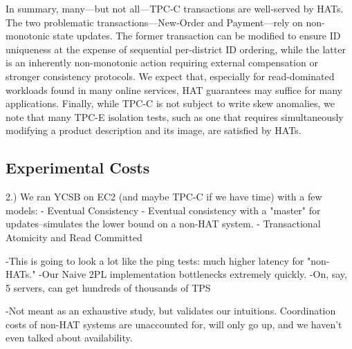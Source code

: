 In summary, many---but not all---TPC-C transactions are well-served by
HATs. The two problematic transactions---New-Order and Payment---rely
on non-monotonic state updates. The former transaction can be modified
to ensure ID uniqueness at the expense of sequential per-district ID
ordering, while the latter is an inherently non-monotonic action
requiring external compensation or stronger consistency protocols. We
expect that, especially for read-dominated workloads found in many
online services, HAT guarantees may suffice for many
applications. Finally, while TPC-C is not subject to write skew
anomalies, we note that many TPC-E isolation tests, such as one that
requires simultaneously modifying a product description and its image,
are satisfied by HATs.

\subsection{Experimental Costs}


2.) We ran YCSB on EC2 (and maybe TPC-C if we have time) with a few models:
	- Eventual Consistency
	- Eventual consistency with a "master" for updates--simulates the lower bound on a non-HAT system.
	- Transactional Atomicity and Read Committed
	
	-This is going to look a lot like the ping tests: much higher latency for "non-HATs."
	-Our Naive 2PL implementation bottlenecks extremely quickly.
	-On, say, 5 servers, can get hundreds of thousands of TPS

	-Not meant as an exhaustive study, but validates our intuitions. Coordination costs of non-HAT systems are unaccounted for, will only go up, and we haven't even talked about availability.

